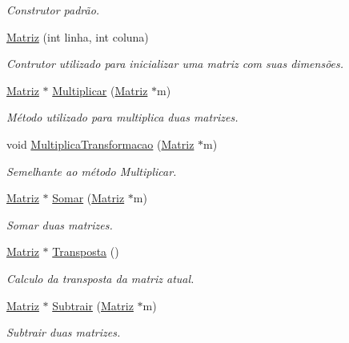 \begin{DoxyCompactItemize}
\begin{DoxyCompactList}\small\item\em Construtor padrão. \end{DoxyCompactList}\item 
\hyperlink{class_matriz_a57a8c6b672158239b429c72f4b4e316c}{Matriz} (int linha, int coluna)
\begin{DoxyCompactList}\small\item\em Contrutor utilizado para inicializar uma matriz com suas dimensões. \end{DoxyCompactList}\item 
\hyperlink{class_matriz}{Matriz} $\ast$ \hyperlink{class_matriz_af9f66302d01429ea558f420ba42175ab}{Multiplicar} (\hyperlink{class_matriz}{Matriz} $\ast$m)
\begin{DoxyCompactList}\small\item\em Método utilizado para multiplica duas matrizes. \end{DoxyCompactList}\item 
void \hyperlink{class_matriz_adf1b06373979d8dd4074347a2f62eeb7}{Multiplica\+Transformacao} (\hyperlink{class_matriz}{Matriz} $\ast$m)
\begin{DoxyCompactList}\small\item\em Semelhante ao método Multiplicar. \end{DoxyCompactList}\item 
\hyperlink{class_matriz}{Matriz} $\ast$ \hyperlink{class_matriz_ae741af63b4094d2cb146cc0cba1a376b}{Somar} (\hyperlink{class_matriz}{Matriz} $\ast$m)
\begin{DoxyCompactList}\small\item\em Somar duas matrizes. \end{DoxyCompactList}\item 
\hyperlink{class_matriz}{Matriz} $\ast$ \hyperlink{class_matriz_a4778d42de62e8d6b47a66fea73894cbd}{Transposta} ()
\begin{DoxyCompactList}\small\item\em Calculo da transposta da matriz atual. \end{DoxyCompactList}\item 
\hyperlink{class_matriz}{Matriz} $\ast$ \hyperlink{class_matriz_ab210cb033064a42d99a71f4ac5266d4d}{Subtrair} (\hyperlink{class_matriz}{Matriz} $\ast$m)
\begin{DoxyCompactList}\small\item\em Subtrair duas matrizes. \end{DoxyCompactList}\item 

\end{DoxyCompactItemize}
